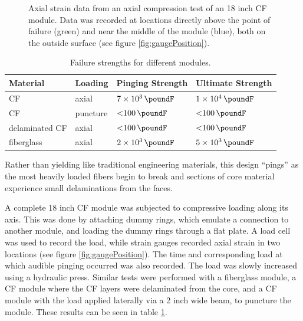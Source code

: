 \documentclass{aiaa-tc}%
\begin{document}
\begin{figure}[t]
{		\caption{
			Positioning of the strain gauges referred to in figure \ref{fig:strain}. 
			The gauges have been circled with colors corresponding to figure \ref{fig:strain}.
			Both are aligned with one of the pillars shown in figures \ref{fig:module} and \ref{fig:crush}.
			The bottom gauge is positioned directly above the point of failure.
			}
		\label{fig:gaugePosition}
	}
	\hfill
	\parbox{0.6\linewidth}
	{
		\centering
		
		\caption{
			Axial strain data from an axial compression test of an 18 inch CF module. 
			Data was recorded at locations directly above the point of failure (green) 
			and near the middle of the module (blue), both on the outside surface (see figure \ref{fig:gaugePosition}).
			}
		\label{fig:strain}
	}
\end{figure}

\begin{table}
	\centering
	\caption{Failure strengths for different modules.}
	\label{tab:compression}
	\begin{tabular}{llll}
		Material & Loading & Pinging Strength & Ultimate Strength\\
		\hline
		CF 		& axial 	& $\SI{7e3}{\poundF}$ 	& $\SI{1e4}{\poundF}$ \\
		CF 		& puncture 	& $\SI{<100}{\poundF}$	& $\SI{<100}{\poundF}$\\
		delaminated CF 	& axial 	& $\SI{<100}{\poundF}$	& $\SI{<100}{\poundF}$\\
		fiberglass 	& axial 	& $\SI{2e3}{\poundF}$ 	& $\SI{5e3}{\poundF}$ \\
	\end{tabular}
\end{table}

Rather than yielding like traditional engineering materials, this design ``pings'' as the most heavily loaded fibers begin to break and sections of core material experience small delaminations from the faces. 

A complete 18 inch CF module was subjected to compressive loading along its axis. This was done by attaching dummy rings, which emulate a connection to another module, and loading the dummy rings through a flat plate. 
A load cell was used to record the load, while strain gauges recorded axial strain in two locations (see figure \ref{fig:gaugePosition}). 
The time and corresponding load at which audible pinging occurred was also recorded.
The load was slowly increased using a hydraulic press. 
Similar tests were performed with a fiberglass module, a CF module where the CF layers were delaminated from the core, and a CF module with the load applied laterally via a 2 inch wide beam, to puncture the module.
These results can be seen in table \ref{tab:compression}.
\end{document}
